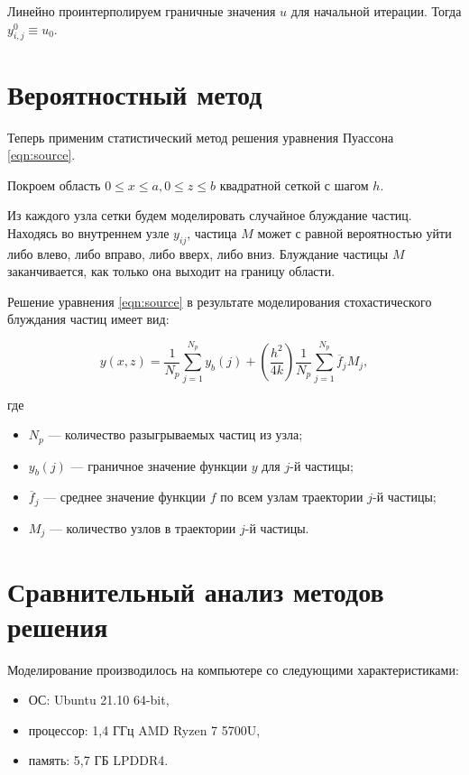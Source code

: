 \documentclass[12pt, a4paper]{article}
\begin{document}
Линейно проинтерполируем граничные значения $u$ для начальной итерации.
Тогда $y_{i, j}^0 \equiv u_0$.

\section{Вероятностный метод}

Теперь применим статистический метод \cite{2} решения уравнения Пуассона \eqref{eqn:source}.

Покроем область $0 \leqslant x \leqslant a, 0 \leqslant z \leqslant b$ квадратной сеткой с шагом $h$.

Из каждого узла сетки будем моделировать случайное блуждание частиц.
Находясь во внутреннем узле $y_{ij}$, частица $M$ может с равной вероятностью уйти либо влево, либо вправо, либо вверх, либо вниз.
Блуждание частицы $M$ заканчивается, как только она выходит на границу области.

Решение уравнения \eqref{eqn:source} в результате моделирования стохастического блуждания частиц имеет вид:

\begin{equation}
	y(x, z) = \frac{1}{N_p} \sum_{j=1}^{N_p} y_b(j) + \left( \frac{h^2}{4k} \right) \frac{1}{N_p} \sum_{j=1}^{N_p} \overline f_jM_j,
\end{equation}

\noindent где

\begin{itemize}
	\item $N_p$ — количество разыгрываемых частиц из узла;
	\item $y_b(j)$ — граничное значение функции $y$ для $j$-й частицы;
	\item $\overline f_j$ — среднее значение функции $f$ по всем узлам траектории $j$-й частицы;
	\item $M_j$ — количество узлов в траектории $j$-й частицы.
\end{itemize}

\section{Сравнительный анализ методов решения}

Моделирование производилось на компьютере со следующими характеристиками:

\begin{itemize}
	\item ОС: Ubuntu 21.10 64-bit,
	\item процессор: 1,4 ГГц AMD Ryzen 7 5700U,
	\item память: 5,7 ГБ LPDDR4.
\end{itemize}
\end{document}
